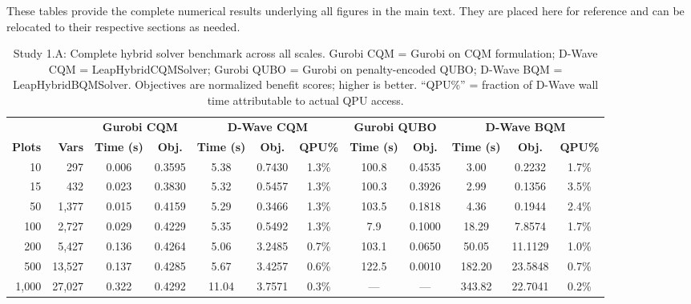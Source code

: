 \documentclass{oqireport}
\begin{document}
These tables provide the complete numerical results underlying all figures in the main text. They are placed here for reference and can be relocated to their respective sections as needed.



\begin{table}[H]
\centering
\caption{Study 1.A: Complete hybrid solver benchmark across all scales. Gurobi CQM = Gurobi on CQM formulation; D-Wave CQM = LeapHybridCQMSolver; Gurobi QUBO = Gurobi on penalty-encoded QUBO; D-Wave BQM = LeapHybridBQMSolver. Objectives are normalized benefit scores; higher is better. ``QPU\%'' = fraction of D-Wave wall time attributable to actual QPU access.}
\label{tab:study1_full_results}
\small
\begin{adjustbox}{max width=\textwidth}
\begin{tabular}{r r c c c c c c c c c c}
\toprule
 & & \multicolumn{2}{c}{\textbf{Gurobi CQM}} & \multicolumn{3}{c}{\textbf{D-Wave CQM}} & \multicolumn{2}{c}{\textbf{Gurobi QUBO}} & \multicolumn{3}{c}{\textbf{D-Wave BQM}} \\
\cmidrule(lr){3-4} \cmidrule(lr){5-7} \cmidrule(lr){8-9} \cmidrule(lr){10-12}
\textbf{Plots} & \textbf{Vars} & \textbf{Time (s)} & \textbf{Obj.} & \textbf{Time (s)} & \textbf{Obj.} & \textbf{QPU\%} & \textbf{Time (s)} & \textbf{Obj.} & \textbf{Time (s)} & \textbf{Obj.} & \textbf{QPU\%} \\
\midrule
10 & 297 & 0.006 & 0.3595 & 5.38 & 0.7430 & 1.3\% & 100.8 & 0.4535 & 3.00 & 0.2232 & 1.7\% \\
15 & 432 & 0.023 & 0.3830 & 5.32 & 0.5457 & 1.3\% & 100.3 & 0.3926 & 2.99 & 0.1356 & 3.5\% \\
50 & 1,377 & 0.015 & 0.4159 & 5.29 & 0.3466 & 1.3\% & 103.5 & 0.1818 & 4.36 & 0.1944 & 2.4\% \\
100 & 2,727 & 0.029 & 0.4229 & 5.35 & 0.5492 & 1.3\% & 7.9 & 0.1000 & 18.29 & 7.8574 & 1.7\% \\
200 & 5,427 & 0.136 & 0.4264 & 5.06 & 3.2485 & 0.7\% & 103.1 & 0.0650 & 50.05 & 11.1129 & 1.0\% \\
500 & 13,527 & 0.137 & 0.4285 & 5.67 & 3.4257 & 0.6\% & 122.5 & 0.0010 & 182.20 & 23.5848 & 0.7\% \\
1,000 & 27,027 & 0.322 & 0.4292 & 11.04 & 3.7571 & 0.3\% & --- & --- & 343.82 & 22.7041 & 0.2\% \\
\bottomrule
\end{tabular}
\end{adjustbox}
\end{table}
\end{document}
